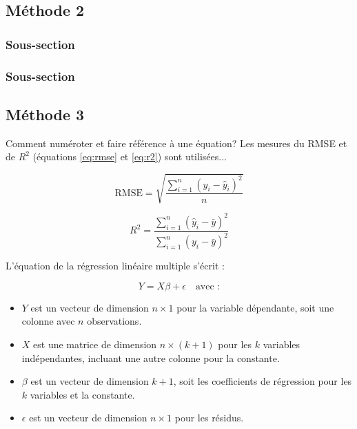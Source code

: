\lipsum[1] %


\subsection{Méthode 2} \label{subsec:methodes2}

\lipsum[1] %

\subsubsection{Sous-section} \label{subsubsec:sous_section}

\lipsum[1] %


\subsubsection{Sous-section} \label{subsubsec:sous_section2}

\lipsum[1] %


\subsection{Méthode 3} \label{subsec:methodes3}
Comment numéroter et faire référence à une équation? Les mesures du RMSE et de $R^2$ (équations \ref{eq:rmse} et \ref{eq:r2}) sont utilisées...


\begin{equation}
\text{RMSE} = \sqrt{\frac{\sum_{i=1}^{n}\left(y_i - \hat{y}_i\right)^2}{n}} 
\label{eq:rmse}
\end{equation}

\begin{equation}
R^2 = \frac{\sum_{i=1}^{n}\left(\hat{y}_i - \bar{y}\right)^2}{\sum_{i=1}^{n}\left(y_i - \bar{y}\right)^2} 
\label{eq:r2}
\end{equation}

L'équation de la régression linéaire multiple s'écrit :

\begin{equation}
Y = X\beta + \epsilon \quad \text{avec :}
\label{eq:regression_lineaire}
\end{equation}
\begin{itemize}
    \item $Y$ est un vecteur de dimension $n \times 1$ pour la variable dépendante, soit une colonne avec $n$ observations.
    \item $X$ est une matrice de dimension $n \times (k+1)$ pour les $k$ variables indépendantes, incluant une autre colonne pour la constante.
    \item $\beta$ est un vecteur de dimension $k+1$, soit les coefficients de régression pour les $k$ variables et la constante.
    \item $\epsilon$ est un vecteur de dimension $n \times 1$ pour les résidus.
\end{itemize} 

